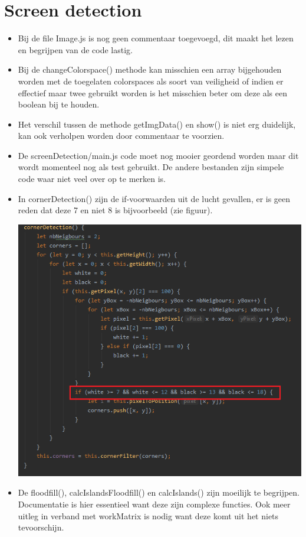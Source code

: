 \documentclass[a4paper,11pt]{article}
\begin{document}
\section{Screen detection}
\begin{itemize}

\item Bij de file Image.js is nog geen commentaar toegevoegd, dit maakt het lezen en begrijpen van de code lastig.
\item Bij de changeColorspace() methode kan misschien een array bijgehouden worden met de toegelaten colorspaces als soort van veiligheid of indien er effectief maar twee gebruikt worden is het misschien beter om deze als een boolean bij te houden. 
\item Het verschil tussen de methode getImgData() en show() is niet erg duidelijk, kan ook verholpen worden door commentaar te voorzien.
\item De screenDetection/main.js code moet nog mooier geordend worden maar dit wordt momenteel nog als test gebruikt. De andere bestanden zijn simpele code waar niet veel over op te merken is.
\item In cornerDetection() zijn de if-voorwaarden uit de lucht gevallen, er is geen reden dat deze 7 en niet 8 is bijvoorbeeld (zie figuur).

\includegraphics[scale=0.75]{code1}
\item De floodfill(), calcIslandsFloodfill() en calcIslands() zijn moeilijk te begrijpen. Documentatie is hier essentieel want deze zijn complexe functies. Ook meer uitleg in verband met workMatrix is nodig want deze komt uit het niets tevoorschijn.


\end{itemize}
\end{document}
